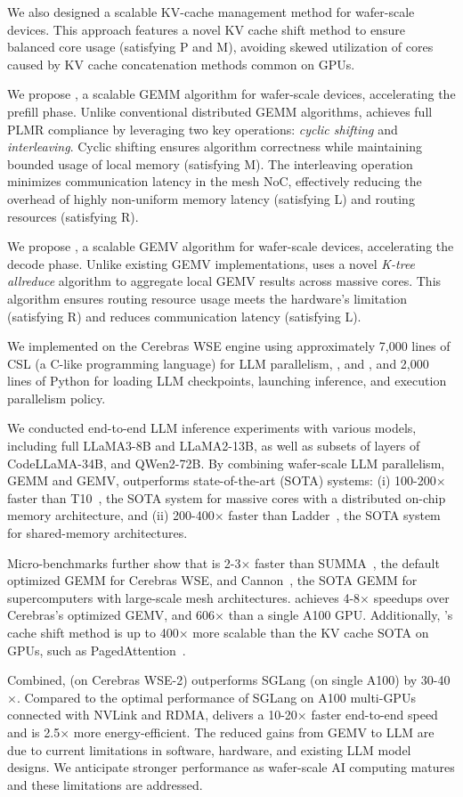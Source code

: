 We also designed a scalable KV-cache management method for wafer-scale devices. This approach features a novel KV cache shift method to ensure balanced core usage (satisfying P and M), avoiding skewed utilization of cores caused by KV cache concatenation methods common on GPUs.

We propose \gemm, a scalable GEMM algorithm for wafer-scale devices, accelerating the prefill phase.
Unlike conventional distributed GEMM algorithms, \gemm achieves full PLMR compliance by leveraging two key operations: \emph{cyclic shifting} and \emph{interleaving}. Cyclic shifting ensures algorithm correctness while maintaining bounded usage of local memory (satisfying M). The interleaving operation minimizes communication latency in the mesh NoC, effectively reducing the overhead of highly non-uniform memory latency (satisfying L) and routing resources (satisfying R).

We propose \gemv, a scalable GEMV algorithm for wafer-scale devices, accelerating the decode phase. Unlike existing GEMV implementations, \gemv uses a novel \emph{K-tree allreduce} algorithm to aggregate local GEMV results across massive cores. This algorithm ensures routing resource usage meets the hardware's limitation (satisfying R) and reduces communication latency (satisfying L).

\vspace{0.2cm}
\noindent
We implemented \sys on the Cerebras WSE engine using approximately 7,000 lines of CSL (a C-like programming language) for LLM parallelism, \gemm, and \gemv, and 2,000 lines of Python for loading LLM checkpoints, launching inference, and execution parallelism policy.

We conducted end-to-end LLM inference experiments with various models, including full LLaMA3-8B and LLaMA2-13B, as well as subsets of layers of CodeLLaMA-34B, and QWen2-72B. By combining wafer-scale LLM parallelism, GEMM and GEMV, \sys outperforms state-of-the-art (SOTA) systems:
(i) 100-200$\times$ faster than T10~\cite{t10}, the SOTA system for massive cores with a distributed on-chip memory architecture, and
(ii) 200-400$\times$ faster than Ladder~\cite{ladder}, the SOTA system for shared-memory architectures.

Micro-benchmarks further show that \gemm is 2-3$\times$ faster than SUMMA~\cite{summa}, the default optimized GEMM for Cerebras WSE, and Cannon~\cite{cannon}, the SOTA GEMM for supercomputers with large-scale mesh architectures. \gemv achieves 4-8$\times$ speedups over Cerebras’s optimized GEMV, and 606$\times$ than a single A100 GPU. Additionally, \sys’s cache shift method is up to 400$\times$ more scalable than the KV cache SOTA on GPUs, such as PagedAttention~\cite{vllm}.

Combined, \sys (on Cerebras WSE-2) outperforms SGLang (on single A100) by 30-40$\times$. Compared to the optimal performance of SGLang on A100 multi-GPUs connected with NVLink and RDMA, \sys delivers a 10-20$\times$ faster end-to-end speed and is 2.5$\times$ more energy-efficient. The reduced gains from GEMV to LLM are due to current limitations in software, hardware, and existing LLM model designs. We anticipate stronger performance as wafer-scale AI computing matures and these limitations are addressed.